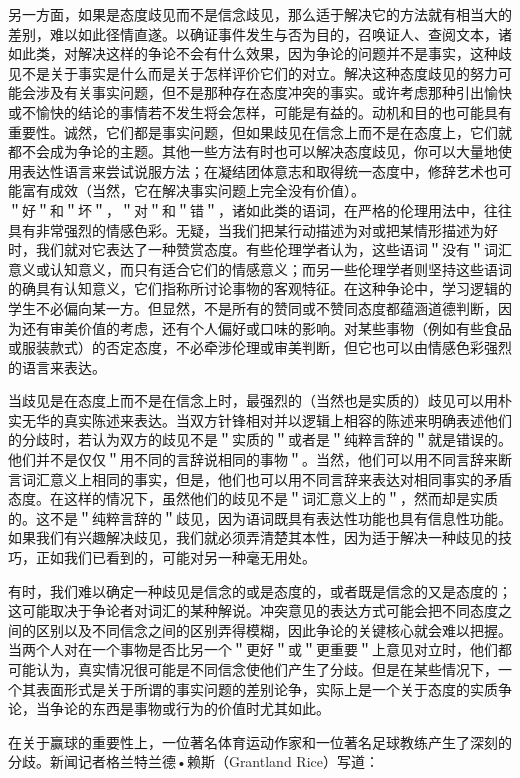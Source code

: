 另一方面，如果是态度歧见而不是信念歧见，那么适于解决它的方法就有相当大的差别，难以如此径情直遂。以确证事件发生与否为目的，召唤证人、查阅文本，诸如此类，对解决这样的争论不会有什么效果，因为争论的问题并不是事实，这种歧见不是关于事实是什么而是关于怎样评价它们的对立。解决这种态度歧见的努力可能会涉及有关事实问题，但不是那种存在态度冲突的事实。或许考虑那种引出愉快或不愉快的结论的事情若不发生将会怎样，可能是有益的。动机和目的也可能具有重要性。诚然，它们都是事实问题，但如果歧见在信念上而不是在态度上，它们就都不会成为争论的主题。其他一些方法有时也可以解决态度歧见，你可以大量地使用表达性语言来尝试说服方法；在凝结团体意志和取得统一态度中，修辞艺术也可能富有成效（当然，它在解决事实问题上完全没有价值）。\\
＂好＂和＂坏＂，＂对＂和＂错＂，诸如此类的语词，在严格的伦理用法中，往往具有非常强烈的情感色彩。无疑，当我们把某行动描述为对或把某情形描述为好时，我们就对它表达了一种赞赏态度。有些伦理学者认为，这些语词＂没有＂词汇意义或认知意义，而只有适合它们的情感意义；而另一些伦理学者则坚持这些语词的确具有认知意义，它们指称所讨论事物的客观特征。在这种争论中，学习逻辑的学生不必偏向某一方。但显然，不是所有的赞同或不赞同态度都蕴涵道德判断，因为还有审美价值的考虑，还有个人偏好或口味的影响。对某些事物（例如有些食品或服装款式）的否定态度，不必牵涉伦理或审美判断，但它也可以由情感色彩强烈的语言来表达。

当歧见是在态度上而不是在信念上时，最强烈的（当然也是实质的）歧见可以用朴实无华的真实陈述来表达。当双方针锋相对并以逻辑上相容的陈述来明确表述他们的分歧时，若认为双方的歧见不是＂实质的＂或者是＂纯粹言辞的＂就是错误的。他们并不是仅仅＂用不同的言辞说相同的事物＂。当然，他们可以用不同言辞来断言词汇意义上相同的事实，但是，他们也可以用不同言辞来表达对相同事实的矛盾态度。在这样的情况下，虽然他们的歧见不是＂词汇意义上的＂，然而却是实质的。这不是＂纯粹言辞的＂歧见，因为语词既具有表达性功能也具有信息性功能。如果我们有兴趣解决歧见，我们就必须弄清楚其本性，因为适于解决一种歧见的技巧，正如我们已看到的，可能对另一种毫无用处。

有时，我们难以确定一种歧见是信念的或是态度的，或者既是信念的又是态度的；这可能取决于争论者对词汇的某种解说。冲突意见的表达方式可能会把不同态度之间的区别以及不同信念之间的区别弄得模糊，因此争论的关键核心就会难以把握。当两个人对在一个事物是否比另一个＂更好＂或＂更重要＂上意见对立时，他们都可能认为，真实情况很可能是不同信念使他们产生了分歧。但是在某些情况下，一个其表面形式是关于所谓的事实问题的差别论争，实际上是一个关于态度的实质争论，当争论的东西是事物或行为的价值时尤其如此。

在关于赢球的重要性上，一位著名体育运动作家和一位著名足球教练产生了深刻的分歧。新闻记者格兰特兰德•赖斯（Grantland Rice）写道：

